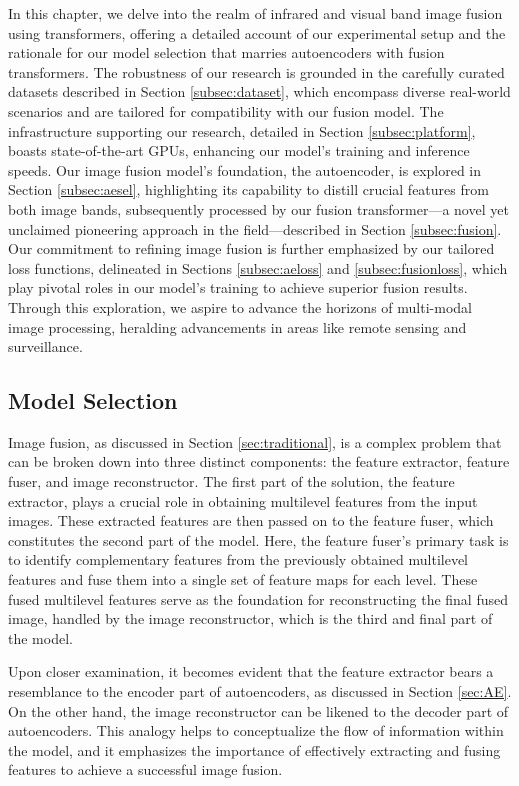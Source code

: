 \label{chp:b3}

In this chapter, we delve into the realm of infrared and visual band image fusion using transformers, offering a detailed account of our experimental setup and the rationale for our model selection that marries autoencoders with fusion transformers. The robustness of our research is grounded in the carefully curated datasets described in Section \ref{subsec:dataset}, which encompass diverse real-world scenarios and are tailored for compatibility with our fusion model. The infrastructure supporting our research, detailed in Section \ref{subsec:platform}, boasts state-of-the-art GPUs, enhancing our model's training and inference speeds. Our image fusion model's foundation, the autoencoder, is explored in Section \ref{subsec:aesel}, highlighting its capability to distill crucial features from both image bands, subsequently processed by our fusion transformer—a novel yet unclaimed pioneering approach in the field—described in Section \ref{subsec:fusion}. Our commitment to refining image fusion is further emphasized by our tailored loss functions, delineated in Sections \ref{subsec:aeloss} and \ref{subsec:fusionloss}, which play pivotal roles in our model's training to achieve superior fusion results. Through this exploration, we aspire to advance the horizons of multi-modal image processing, heralding advancements in areas like remote sensing and surveillance.
\subsection{Model Selection} \label{sec:model}

Image fusion, as discussed in Section \ref{sec:traditional}, is a complex problem that can be broken down into three distinct components: the feature extractor, feature fuser, and image reconstructor. The first part of the solution, the feature extractor, plays a crucial role in obtaining multilevel features from the input images. These extracted features are then passed on to the feature fuser, which constitutes the second part of the model. Here, the feature fuser's primary task is to identify complementary features from the previously obtained multilevel features and fuse them into a single set of feature maps for each level. These fused multilevel features serve as the foundation for reconstructing the final fused image, handled by the image reconstructor, which is the third and final part of the model.

Upon closer examination, it becomes evident that the feature extractor bears a resemblance to the encoder part of autoencoders, as discussed in Section \ref{sec:AE}. On the other hand, the image reconstructor can be likened to the decoder part of autoencoders. This analogy helps to conceptualize the flow of information within the model, and it emphasizes the importance of effectively extracting and fusing features to achieve a successful image fusion.

